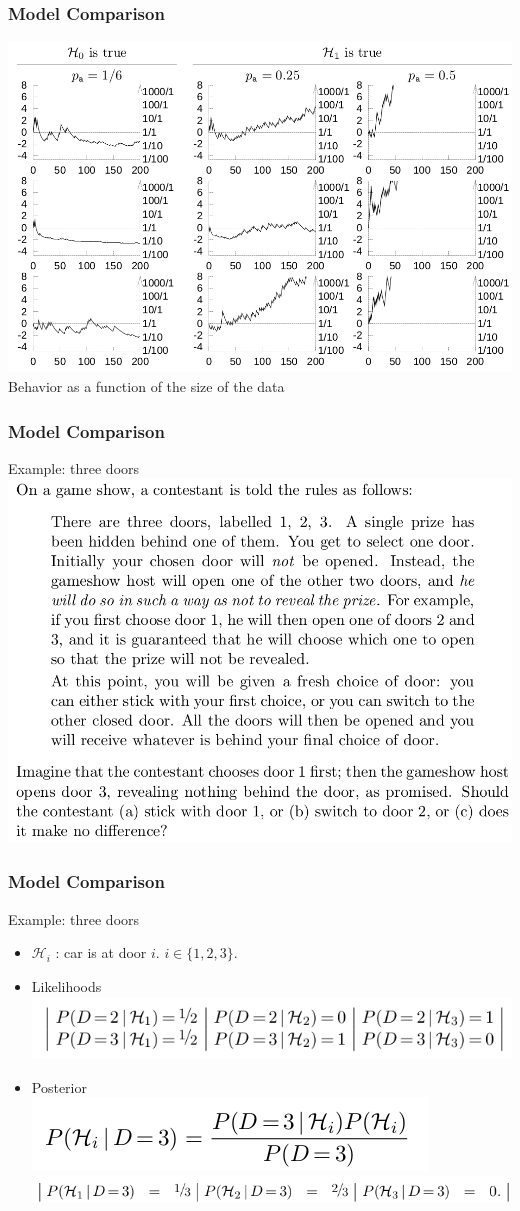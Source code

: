 \documentclass{beamer}
\begin{document}
\begin{frame}
	\frametitle{Model Comparison}
   \includegraphics[width=.8\textwidth]{e17}\\
	Behavior as a function of the size of the data
\end{frame}

\begin{frame}
	\frametitle{Model Comparison}
	Example: three doors
   \includegraphics[width=.8\textwidth]{e18}\\
\end{frame}

\begin{frame}
	\frametitle{Model Comparison}
	Example: three doors
\begin{itemize}
\item $\mathcal{H}_i$ : car is at door $i$. $i\in\{1,2,3\}$.
\item Likelihoods
   \includegraphics[width=.8\textwidth]{3doors}
\item Posterior\\
   \includegraphics[width=.5\textwidth]{3doors2}
   \includegraphics[width=.8\textwidth]{3doors3}
\end{itemize}

\end{frame}
\end{document}
